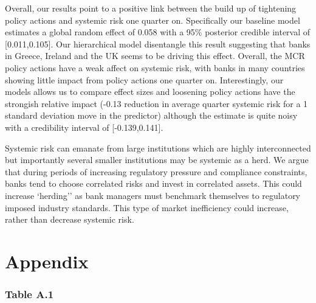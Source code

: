 \documentclass[
  10pt,
]{article}
\begin{document}
Overall, our results point to a positive link between the build up of
tightening policy actions and systemic risk one quarter on. Specifically
our baseline model estimates a global random effect of 0.058 with a 95\%
posterior credible interval of {[}0.011,0.105{]}. Our hierarchical model
disentangle this result suggesting that banks in Greece, Ireland and the
UK seems to be driving this effect. Overall, the MCR policy actions have
a weak affect on systemic risk, with banks in many countries showing
little impact from policy actions one quarter on. Interestingly, our
models allows us to compare effect sizes and loosening policy actions
have the strongish relative impact (-0.13 reduction in average quarter
systemic risk for a 1 standard deviation move in the predictor) although
the estimate is quite noisy with a credibility interval of
{[}-0.139,0.141{]}.

Systemic risk can emanate from large institutions which are highly
interconnected but importantly several smaller institutions may be
systemic as a herd. We argue that during periods of increasing
regulatory pressure and compliance constraints, banks tend to choose
correlated risks and invest in correlated assets. This could increase
`herding'' as bank managers must benchmark themselves to regulatory
imposed industry standards. This type of market inefficiency could
increase, rather than decrease systemic risk.

\hypertarget{appendix}{%
\section{Appendix}\label{appendix}}

\hypertarget{table-a.1}{%
\subsubsection{Table A.1}\label{table-a.1}}
\end{document}
